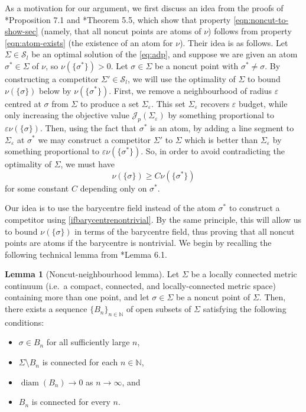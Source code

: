 \documentclass[preprint, reqno]{amsart}
\DeclareMathOperator*{\diam}{diam}
\renewcommand{\epsilon}{\varepsilon}
\theoremstyle{definition}
\newtheorem{lemma}[definition]{Lemma}
\numberwithin{equation}{section}
\begin{document}
As a motivation for our argument, we first discuss an idea from the
proofs of \cite{Buttazzo03}*{Proposition 7.1} and
\cite{Stepanov06}*{Theorem 5.5}, which show that property
\eqref{eqn:noncut-to-show-sec} (namely, that all noncut points are
atoms of $\nu$) follows from property \eqref{eqn:atom-exists} (the
existence of an atom for $\nu$). Their idea is as follows. Let $\Sigma
\in \mathcal{S}_l$ be an optimal solution of the \eqref{eq:adp}, and
suppose we are given an atom $\sigma^* \in \Sigma$ of $\nu$, so
$\nu(\{\sigma^*\}) > 0$. Let $\sigma \in \Sigma$ be a noncut point
with $\sigma^* \ne \sigma$. By constructing a competitor $\Sigma' \in
\mathcal{S}_l$, we will use the optimality of $\Sigma$ to bound
$\nu(\{\sigma\})$ below by $\nu(\{\sigma^*\})$. First, we remove a
neighbourhood of radius $\epsilon$ centred at $\sigma$ from $\Sigma$
to produce a set $\Sigma_{\epsilon}$. This set $\Sigma_{\epsilon}$
recovers $\epsilon$ budget, while only increasing the objective value
$\mathscr{J}_p(\Sigma_{\epsilon})$ by something proportional to
$\epsilon \nu(\{\sigma\})$. Then, using the fact that $\sigma^*$ is an
atom, by adding a line segment to $\Sigma_{\epsilon}$ at $\sigma^*$ we
may construct a competitor $\Sigma'$ to $\Sigma$ which is better than
$\Sigma_{\epsilon}$ by something proportional to $\epsilon
\nu(\{\sigma^*\})$. So, in order to avoid contradicting the optimality
of $\Sigma$, we must have
\[
  \nu(\{\sigma\}) \geq C\nu(\{\sigma^*\})
\]
for some constant $C$ depending only on $\sigma^*$.


Our idea is to use the barycentre field instead of the atom $\sigma^*$
to construct a competitor using \cref{ifbarycentrenontrivial}. By the
same principle, this will allow us to bound $\nu(\{\sigma\})$ in terms
of the barycentre field, thus proving that all noncut points are atoms
if the barycentre is nontrivial. We begin by recalling the following
technical lemma from \cite{Buttazzo03}*{Lemma 6.1}.

\begin{lemma}[Noncut-neighbourhood lemma]\label{noncutneighbourhood}
  Let $\Sigma$ be a locally connected metric continuum (i.e.\ a
  compact, connected, and locally-connected metric space) containing
  more than one point, and let $\sigma \in \Sigma$ be a noncut point
  of $\Sigma$. Then, there exists a sequence $\{B_n\}_{n \in
    \mathbb{N}}$ of open subsets of $\Sigma$ satisfying the following
  conditions:
  \begin{itemize}
    \item[(i)] $\sigma \in B_n$ for all sufficiently large $n$,
    \item[(ii)] $\Sigma \setminus B_n$ is connected for each $n \in
      \mathbb{N}$,
    \item[(iii)] $\diam(B_n) \to 0$ as $n \to \infty$, and
    \item[(iv)] $B_n$ is connected for every $n$.
  \end{itemize}
\end{lemma}
\end{document}

